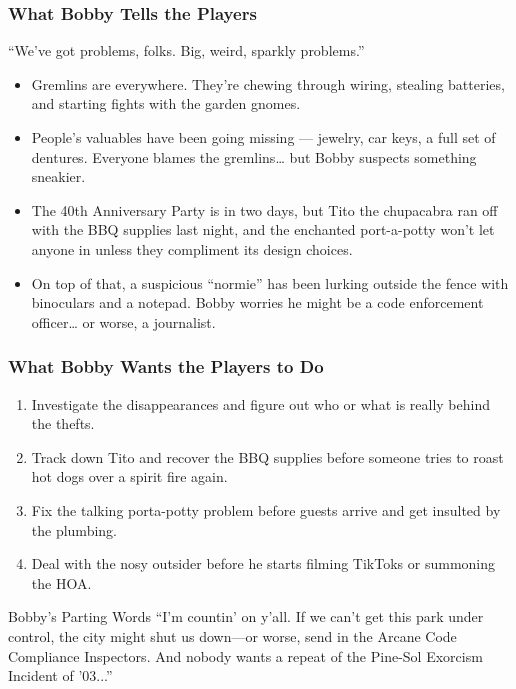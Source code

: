 \subsubsection{What Bobby Tells the Players}
\begin{Example}{}
    “We’ve got problems, folks. Big, weird, sparkly problems.”
\end{Example}
\begin{itemize}
    \item Gremlins are everywhere. They’re chewing through wiring, stealing batteries, and starting fights with the garden gnomes.
    \item People’s valuables have been going missing — jewelry, car keys, a full set of dentures. Everyone blames the gremlins… but Bobby suspects something sneakier.
    \item The 40th Anniversary Party is in two days, but Tito the chupacabra ran off with the BBQ supplies last night, and the enchanted port-a-potty won’t let anyone in unless they compliment its design choices.
    \item On top of that, a suspicious “normie” has been lurking outside the fence with binoculars and a notepad. Bobby worries he might be a code enforcement officer… or worse, a journalist.
\end{itemize}

\subsubsection{What Bobby Wants the Players to Do}
\begin{enumerate}
    \item Investigate the disappearances and figure out who or what is really behind the thefts.
    \item Track down Tito and recover the BBQ supplies before someone tries to roast hot dogs over a spirit fire again.
    \item Fix the talking porta-potty problem before guests arrive and get insulted by the plumbing.
    \item Deal with the nosy outsider before he starts filming TikToks or summoning the HOA.
\end{enumerate}

\begin{Example}{Bobby’s Parting Words}
    “I’m countin’ on y’all. If we can’t get this park under control, the city might shut us down—or worse, send in the Arcane Code Compliance Inspectors. And nobody wants a repeat of the Pine-Sol Exorcism Incident of ’03...”
\end{Example}

